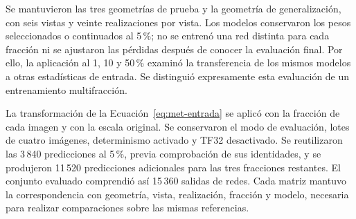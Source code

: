 Se mantuvieron las tres geometrías de prueba y la geometría de generalización, con seis vistas y veinte realizaciones por vista. Los modelos conservaron los pesos seleccionados o continuados al 5\,\%; no se entrenó una red distinta para cada fracción ni se ajustaron las pérdidas después de conocer la evaluación final. Por ello, la aplicación al 1, 10 y 50\,\% examinó la transferencia de los mismos modelos a otras estadísticas de entrada. Se distinguió expresamente esta evaluación de un entrenamiento multifracción.

La transformación de la Ecuación~\eqref{eq:met-entrada} se aplicó con la fracción de cada imagen y con la escala original. Se conservaron el modo de evaluación, lotes de cuatro imágenes, determinismo activado y TF32 desactivado. Se reutilizaron las 3\,840 predicciones al 5\,\%, previa comprobación de sus identidades, y se produjeron 11\,520 predicciones adicionales para las tres fracciones restantes. El conjunto evaluado comprendió así 15\,360 salidas de redes. Cada matriz mantuvo la correspondencia con geometría, vista, realización, fracción y modelo, necesaria para realizar comparaciones sobre las mismas referencias.

